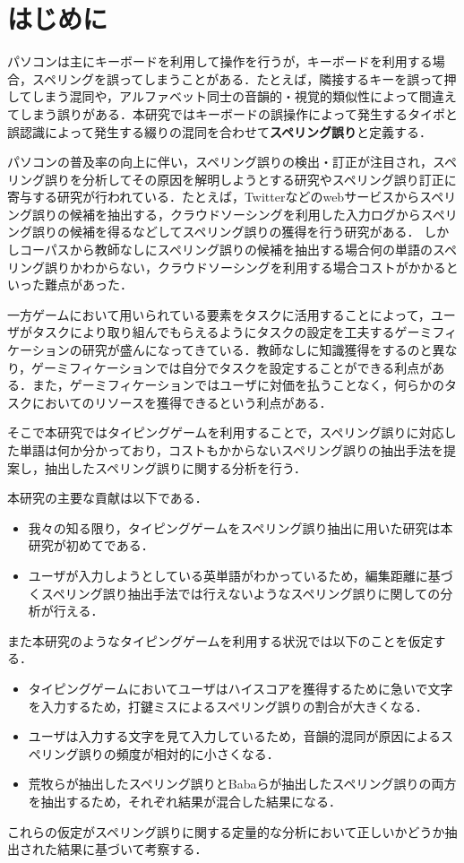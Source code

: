 \chapter{はじめに}
パソコンは主にキーボードを利用して操作を行うが，キーボードを利用する場合，スペリングを誤ってしまうことがある．たとえば，隣接するキーを誤って押してしまう混同や，アルファベット同士の音韻的・視覚的類似性によって間違えてしまう誤りがある．本研究ではキーボードの誤操作によって発生するタイポと誤認識によって発生する綴りの混同を合わせて\textbf{スペリング誤り}と定義する．

パソコンの普及率の向上に伴い，スペリング誤りの検出・訂正が注目され，スペリング誤りを分析してその原因を解明しようとする研究やスペリング誤り訂正に寄与する研究が行われている．たとえば，Twitterなどのwebサービスからスペリング誤りの候補を抽出する\cite{aramakiNLP2010}，クラウドソーシングを利用した入力ログからスペリング誤りの候補を得る\cite{babaACL2012}などしてスペリング誤りの獲得を行う研究がある．
しかしコーパスから教師なしにスペリング誤りの候補を抽出する場合何の単語のスペリング誤りかわからない，クラウドソーシングを利用する場合コストがかかるといった難点があった．

一方ゲームにおいて用いられている要素をタスクに活用することによって，ユーザがタスクにより取り組んでもらえるようにタスクの設定を工夫するゲーミフィケーションの研究が盛んになってきている\cite{deterdingACM2011}．教師なしに知識獲得をするのと異なり，ゲーミフィケーションでは自分でタスクを設定することができる利点がある．また，ゲーミフィケーションではユーザに対価を払うことなく，何らかのタスクにおいてのリソースを獲得できるという利点がある．

そこで本研究ではタイピングゲームを利用することで，スペリング誤りに対応した単語は何か分かっており，コストもかからないスペリング誤りの抽出手法を提案し，抽出したスペリング誤りに関する分析を行う．

本研究の主要な貢献は以下である．

\begin{itemize}
 \item 我々の知る限り，タイピングゲームをスペリング誤り抽出に用いた研究は本研究が初めてである．
 \item ユーザが入力しようとしている英単語がわかっているため，編集距離に基づくスペリング誤り抽出手法\cite{aramakiNLP2010}では行えないようなスペリング誤りに関しての分析が行える．
\end{itemize}

また本研究のようなタイピングゲームを利用する状況では以下のことを仮定する．

\begin{itemize}
 \item タイピングゲームにおいてユーザはハイスコアを獲得するために急いで文字を入力するため，打鍵ミスによるスペリング誤りの割合が大きくなる．
 \item ユーザは入力する文字を見て入力しているため，音韻的混同が原因によるスペリング誤りの頻度が相対的に小さくなる．
 \item 荒牧らが抽出したスペリング誤り\cite{aramakiNLP2010}とBabaらが抽出したスペリング誤り\cite{babaACL2012}の両方を抽出するため，それぞれ結果が混合した結果になる．
\end{itemize}

これらの仮定がスペリング誤りに関する定量的な分析において正しいかどうか抽出された結果に基づいて考察する．